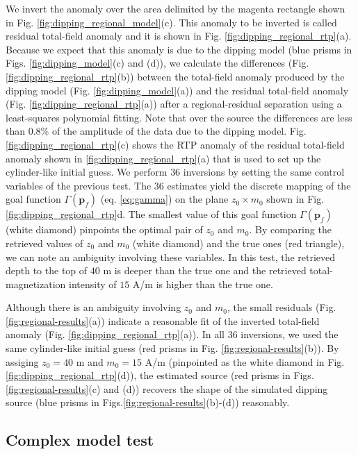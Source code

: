 We invert the anomaly over the area delimited by the magenta rectangle shown in Fig. \ref{fig:dipping_regional_model}(c).
This anomaly to be inverted is called residual total-field anomaly and it is shown in 
Fig. \ref{fig:dipping_regional_rtp}(a).
Because we expect that this anomaly is due to the dipping model (blue prisms in Figs. \ref{fig:dipping_model}(c) and (d)), we calculate the 
differences (Fig. \ref{fig:dipping_regional_rtp}(b)) between the total-field anomaly produced by the dipping model (Fig. \ref{fig:dipping_model}(a)) and the residual total-field anomaly 
(Fig. \ref{fig:dipping_regional_rtp}(a)) after a regional-residual separation using a least-squares polynomial fitting. 
Note that over the source the differences are less than $ 0.8\%$ of the amplitude of the data due to the dipping model.
Fig. \ref{fig:dipping_regional_rtp}(c) shows the RTP anomaly of the residual total-field anomaly shown in \ref{fig:dipping_regional_rtp}(a) that is used to set up the 
cylinder-like initial guess.
We perform $ 36 $ inversions by setting the same control variables of the previous test.
The $ 36 $ estimates yield the discrete mapping of the goal function $\Gamma(\mathbf{p}_f)$ (eq. \ref{eq:gamma}) 
on the plane $z_0 \times m_0 $ shown in Fig. \ref{fig:dipping_regional_rtp}d.
The smallest value of this goal function $\Gamma(\mathbf{p}_f)$ (white diamond) pinpoints 
the optimal pair of $z_0$ and $m_0$.
By comparing the retrieved values of $z_0$ and $m_0$ (white diamond) and
the true ones (red triangle), we can note an ambiguity involving these variables.
In this test, the retrieved depth to the top of $ 40 $ m is deeper than the true one and the 
retrieved total-magnetization intensity of $ 15 $ A/m is higher than the true one.

Although there is an ambiguity involving $z_0$ and $m_0$, the small residuals (Fig. \ref{fig:regional-results}(a)) indicate a reasonable fit of the inverted total-field anomaly
(Fig. \ref{fig:dipping_regional_rtp}(a)).
In all 36 inversions, we used the same cylinder-like initial guess (red prisms in Fig. \ref{fig:regional-results}(b)).
By assiging $z_0 = 40$ m and $m_0 = 15$ A/m (pinpointed as the white diamond in Fig. \ref{fig:dipping_regional_rtp}(d)), the estimated source (red prisms in Figs.\ref{fig:regional-results}(c) and (d)) recovers the shape of the simulated dipping source 
(blue prisms in Figs.\ref{fig:regional-results}(b)-(d)) reasonably.

\subsection{Complex model test}

